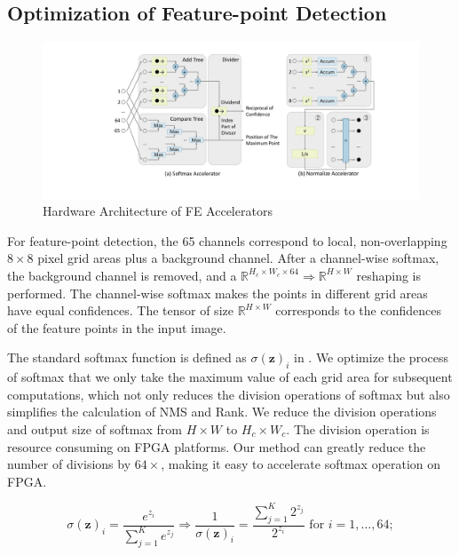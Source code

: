 \subsection{Optimization of Feature-point Detection}
\label{sec:softmaxopt}

\begin{figure}[t]
    \centering  
    \vspace{-0.1cm} 
    \setlength{\abovecaptionskip}{0cm} 
    \setlength{\belowcaptionskip}{-0.05cm} 
    \includegraphics[width=0.99\linewidth]{fig/FEaccelerator.pdf}
    \caption{Hardware Architecture of FE Accelerators}
    \label{fig:FEaccelerator}
\end{figure}

For feature-point detection, the 65 channels correspond to local, non-overlapping $8 \times 8$ pixel grid areas plus a background channel. 
After a channel-wise softmax, the background channel is removed, and a $\mathbb{R}^{H_c\times W_c\times64}\Rightarrow \mathbb{R}^{H\times W}$ reshaping is performed. 
The channel-wise softmax makes the points in different grid areas have equal confidences.
The tensor of size $\mathbb{R}^{H\times W}$ corresponds to the confidences of the feature points in the input image.

The standard softmax function is defined as $\sigma (\mathbf {z} )_{i}$ in .
We optimize the process of softmax that we only take the maximum value of each grid area for subsequent computations, which not only reduces the division operations of softmax but also simplifies the calculation of NMS and Rank.
We reduce the division operations and output size of softmax from $H \times W$ to $H_c \times W_c$.
The division operation is resource consuming on FPGA platforms. 
Our method can greatly reduce the number of divisions by $64 \times$, making it easy to accelerate softmax operation on FPGA.

\begin{equation}
    \sigma (\mathbf {z} )_{i}={\frac {e^{z_{i}}}{\sum _{j=1}^{K}e^{z_{j}}}}
    \Rightarrow
    \frac{1}{\sigma (\mathbf {z} )_{i}}={\frac {\sum _{j=1}^{K}2^{z_{j}}}{2^{z_{i}}}}{\text{ for }}i=1,\dotsc ,64;
    \label{equ:softmax_hard}
\end{equation}

